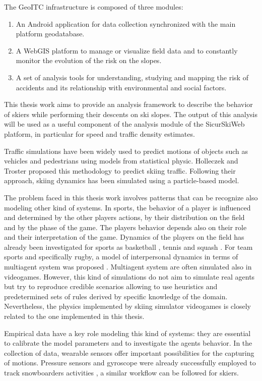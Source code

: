 \documentclass[12pt,a4paper,twoside]{book}
\begin{document}
The GeoITC infrastructure is composed of three modules:
\begin{enumerate}
\item An Android application for data collection synchronized with the main platform geodatabase.
\item A WebGIS platform to manage or visualize field data and to constantly monitor the evolution of the risk on the slopes.
\item A set of analysis tools for understanding, studying and mapping the risk of accidents and its relationship with environmental and social factors.
\end{enumerate}
This thesis work aims to provide an analysis framework to describe the behavior of skiers while performing their descents on ski slopes. The output of this analysis will be used as a useful component of the analysis module of the SicurSkiWeb platform, in particular for speed and traffic density estimates.

Traffic simulations have been widely used to predict motions of objects such as vehicles and pedestrians using models from statistical physic. Holleczek and Troster proposed this methodology to predict skiing traffic. Following their approach, skiing dynamics has been simulated using a particle-based model.

The problem faced in this thesis work involves patterns that can be recognize also modeling other kind of systems. In sports, the behavior of a player is influenced and determined by the other players actions, by their distribution on the field and by the phase of the game. The players behavior depends also on their role and their interpretation of the game. Dynamics of the players on the field has already been investigated for sports as basketball \cite{bo2010}, tennis \cite{pa2005} and squash \cite{mc2006}. For team sports and specifically rugby, a model of interpersonal dynamics in terms of multiagent system was proposed \cite{qu2009}. Multiagent system are often simulated also in videogames. However, this kind of simulations do not aim to simulate real agents but try to reproduce credible scenarios allowing to use heuristics and predetermined sets of rules derived by specific knowledge of the domain. Nevertheless, the physics implemented by skiing simulator videogames is closely related to the one implemented in this thesis.

Empirical data have a key role modeling this kind of systems: they are essential to calibrate the model parameters and to investigate the agents behavior. In the collection of data, wearable sensors offer important possibilities for the capturing of motions. Pressure sensors and gyroscope were already successfully employed to track snowboarders activities \cite{hol2010}, a similar workflow can be followed for skiers.
\end{document}
